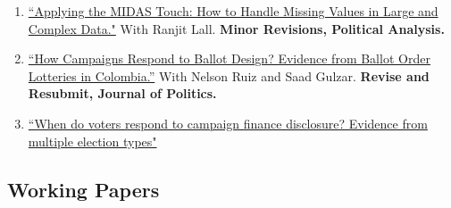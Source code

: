 \documentclass[11pt, a4paper]{article}
\begin{document}
\begin{enumerate}

\item \href{https://doi.org/10.33774/apsa-2020-3tk40-v3}{``Applying the MIDAS Touch: How to Handle Missing Values in Large and Complex Data."} With Ranjit Lall. \textbf{Minor Revisions, Political Analysis.}

\item \href{https://www.dropbox.com/s/4uybbp4h9shmzxt/ballots_colombia.pdf?raw=1}{``How Campaigns Respond to Ballot Design? Evidence from Ballot Order Lotteries in Colombia.''} With Nelson Ruiz and Saad Gulzar. \textbf{Revise and Resubmit, Journal of Politics.}

\item \href{https://ts-robinson.com/publication/robinson-voters-disclosure-2020/robinson-voters-disclosure-2020.pdf}{``When do voters respond to campaign finance disclosure? Evidence from multiple election types"}


\end{enumerate}

\subsection*{Working Papers}
\end{document}
